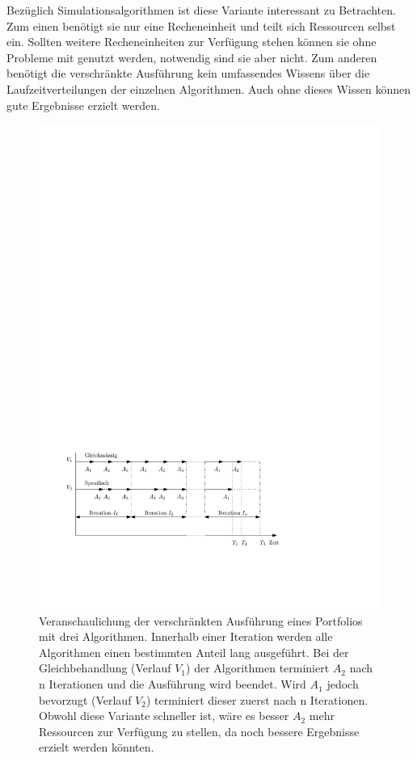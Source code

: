 Bezüglich Simulationsalgorithmen ist diese Variante interessant zu Betrachten. Zum einen benötigt sie nur eine Recheneinheit und teilt sich Ressourcen selbst ein. Sollten weitere Recheneinheiten zur Verfügung stehen können sie ohne Probleme mit genutzt werden, notwendig sind sie aber nicht. Zum anderen benötigt die verschränkte Ausführung kein umfassendes Wissens über die Laufzeitverteilungen der einzelnen Algorithmen. Auch ohne dieses Wissen können gute Ergebnisse erzielt werden. \\

\begin{figure}[h]
\centering
\includegraphics{verschraenkt.pdf}
\caption[Verschr\"ankte Ausf\"uhrung]{Veranschaulichung der verschränkten Ausführung eines Portfolios mit drei Algorithmen. Innerhalb einer Iteration werden alle Algorithmen einen bestimmten Anteil lang ausgeführt. Bei der Gleichbehandlung (Verlauf $V_1$) der Algorithmen terminiert $A_2$ nach n Iterationen und die Ausführung wird beendet. Wird $A_1$ jedoch bevorzugt (Verlauf $V_2$) terminiert dieser zuerst nach n Iterationen. Obwohl diese Variante schneller ist, wäre es besser $A_2$ mehr Ressourcen zur Verfügung zu stellen, da noch bessere Ergebnisse erzielt werden könnten.}
\label{verschraenkt}
\end{figure}

